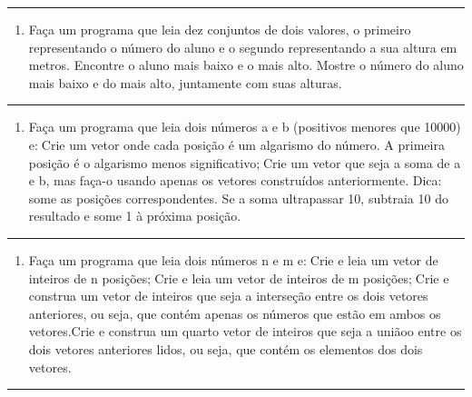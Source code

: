 \documentclass[12pt,a4paper]{article}
\renewcommand{\linethickness}{0.05em}
\providecommand{\tightlist}{%
      \setlength{\itemsep}{0pt}\setlength{\parskip}{0pt}}
\begin{document}
    \begin{center}\rule{0.5\linewidth}{\linethickness}\end{center}

\begin{enumerate}
\def\labelenumi{\arabic{enumi}.}
\setcounter{enumi}{28}
\tightlist
\item
  Faça um programa que leia dez conjuntos de dois valores, o primeiro
  representando o número do aluno e o segundo representando a sua altura
  em metros. Encontre o aluno mais baixo e o mais alto. Mostre o número
  do aluno mais baixo e do mais alto, juntamente com suas alturas.
\end{enumerate}

    \begin{center}\rule{0.5\linewidth}{\linethickness}\end{center}

\begin{enumerate}
\def\labelenumi{\arabic{enumi}.}
\setcounter{enumi}{29}
\tightlist
\item
  Faça um programa que leia dois números a e b (positivos menores que
  10000) e:Crie um vetor onde cada posição é um algarismo do número. A
  primeira posição é o algarismo menos significativo;Crie um vetor que
  seja a soma de a e b, mas faça-o usando apenas os vetores construídos
  anteriormente. Dica: some as posições correspondentes. Se a soma
  ultrapassar 10, subtraia 10 do resultado e some 1 à próxima posição.
\end{enumerate}

    \begin{center}\rule{0.5\linewidth}{\linethickness}\end{center}

\begin{enumerate}
\def\labelenumi{\arabic{enumi}.}
\setcounter{enumi}{30}
\tightlist
\item
  Faça um programa que leia dois números n e m e:Crie e leia um vetor
  de inteiros de n posições;Crie e leia um vetor de inteiros de m
  posições;Crie e construa um vetor de inteiros que seja a interseção
  entre os dois vetores anteriores, ou seja, que contém apenas os
  números que estão em ambos os vetores.Crie e construa um quarto vetor
  de inteiros que seja a uniãoo entre os dois vetores anteriores lidos,
  ou seja, que contém os elementos dos dois vetores.
\end{enumerate}

    \begin{center}\rule{0.5\linewidth}{\linethickness}\end{center}
\end{document}
